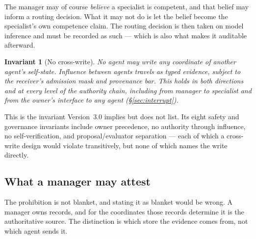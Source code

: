 \documentclass[11pt]{article}
\newtheorem{invariant}{Invariant}
\begin{document}
The manager may of course \emph{believe} a specialist is competent, and that belief may inform a routing decision. What it may not do is let the belief become the specialist's own competence claim. The routing decision is then taken on model inference and must be recorded as such --- which is also what makes it auditable afterward.

\begin{invariant}[No cross-write]
\label{inv:nocrosswrite}
No agent may write any coordinate of another agent's self-state. Influence between agents travels as typed evidence, subject to the receiver's admission mask and provenance bar. This holds in both directions and at every level of the authority chain, including from manager to specialist and from the owner's interface to any agent (\S\ref{sec:interrupt}).
\end{invariant}

This is the invariant Version~3.0 implies but does not list. Its eight safety and governance invariants include owner precedence, no authority through influence, no self-verification, and proposal/evaluator separation --- each of which a cross-write design would violate transitively, but none of which names the write directly.

\subsection{What a manager may attest}

The prohibition is not blanket, and stating it as blanket would be wrong. A manager owns records, and for the coordinates those records determine it is the authoritative source. The distinction is which store the evidence comes from, not which agent sends it.
\end{document}
